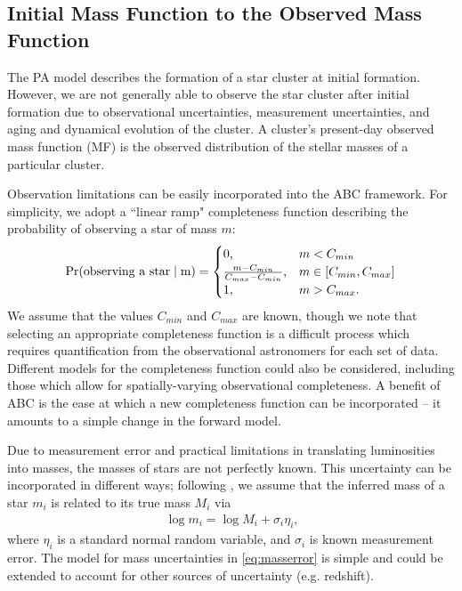 \documentclass[12pt]{article}
\newcommand{\Proba}{\rm{Pr}}
\begin{document}
\subsection{Initial Mass Function to the Observed Mass Function} \label{sec:obs_challenges}
The PA model describes the formation of a star cluster at initial formation.  However, we are not generally able to observe the star cluster after initial formation due to observational uncertainties, measurement uncertainties, and aging and dynamical evolution of the cluster.  A cluster's present-day observed mass function (MF) is the observed distribution of the stellar masses of a particular cluster.

Observation limitations can be easily incorporated into the ABC framework.  For simplicity, we adopt a ``linear ramp" completeness function describing the probability of observing a star of mass $m$:
\begin{align}
	\Proba(\text{observing a star} \mid m) = \begin{cases} 0 \text{,} & m < C_{min}\\
								\frac{m - C_{min}}{C_{max} - C_{min}}\text{,} & m \in [C_{min}, C_{max}] \\
								1 \text{,} & m > C_{max} \text{.}
								\end{cases} \label{eq:ramp}
\end{align}
We assume that the values $C_{min}$ and $C_{max}$ are known, though we note that selecting an appropriate completeness function is a difficult process which requires quantification from the observational astronomers for each set of data.
Different models for the completeness function could also be considered, including those which allow for spatially-varying observational completeness.  A benefit of ABC is the ease at which a new completeness function can be incorporated -- it amounts to a simple change in the forward model.  

Due to measurement error and practical limitations in translating luminosities into masses, the masses of stars are not perfectly known. 
This uncertainty can be incorporated in different ways; following \cite{weisz13}, we assume that the inferred mass of a star $m_i$ is related to its true mass $M_i$ via 
\begin{align}
	\log m_i = \log M_i + \sigma_i \eta_i \text{,}
	\label{eq:masserror}
\end{align}
where $\eta_i$ is a standard normal random variable, and $\sigma_i$ is known measurement error.   %
The model for mass uncertainties in \eqref{eq:masserror} is simple and could be extended to account for other sources of uncertainty (e.g. redshift).
\end{document}
